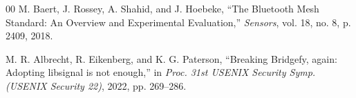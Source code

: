 \documentclass[conference]{IEEEtran}
\begin{document}
\begin{thebibliography}{00}
M. Baert, J. Rossey, A. Shahid, and J. Hoebeke, ``The Bluetooth Mesh Standard: An Overview and Experimental Evaluation,'' \textit{Sensors}, vol. 18, no. 8, p. 2409, 2018.

M. R. Albrecht, R. Eikenberg, and K. G. Paterson, ``Breaking Bridgefy, again: Adopting libsignal is not enough,'' in \textit{Proc. 31st USENIX Security Symp. (USENIX Security 22)}, 2022, pp. 269--286.

\end{thebibliography}
\end{document}

